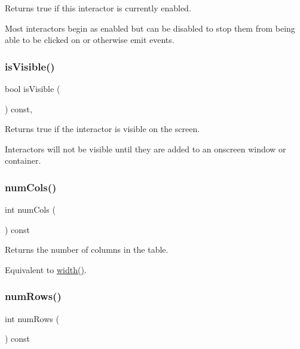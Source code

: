 Returns true if this interactor is currently enabled. 

Most interactors begin as enabled but can be disabled to stop them from being able to be clicked on or otherwise emit events. \mbox{\label{classGInteractor_a9d8a6cfb13917785c143e74d40e4e2be}} 
\subsubsection{\texorpdfstring{is\+Visible()}{isVisible()}}
{\footnotesize\ttfamily bool is\+Visible (\begin{DoxyParamCaption}{ }\end{DoxyParamCaption}) const\hspace{0.3cm}{\ttfamily [virtual]}, {\ttfamily [inherited]}}



Returns true if the interactor is visible on the screen. 

Interactors will not be visible until they are added to an onscreen window or container. \mbox{\label{classGTable_a5997e103e56aae1db12e1f7f02e136c5}} 
\subsubsection{\texorpdfstring{num\+Cols()}{numCols()}}
{\footnotesize\ttfamily int num\+Cols (\begin{DoxyParamCaption}{ }\end{DoxyParamCaption}) const\hspace{0.3cm}{\ttfamily [virtual]}}



Returns the number of columns in the table. 

Equivalent to \mbox{\hyperlink{classGTable_ad72663daf610f2a0833a2fc3d78e4fdf}{width()}}. \mbox{\label{classGTable_a00b7e69dd5c43e42cc91db26c459ad8b}} 
\subsubsection{\texorpdfstring{num\+Rows()}{numRows()}}
{\footnotesize\ttfamily int num\+Rows (\begin{DoxyParamCaption}{ }\end{DoxyParamCaption}) const\hspace{0.3cm}{\ttfamily [virtual]}}



